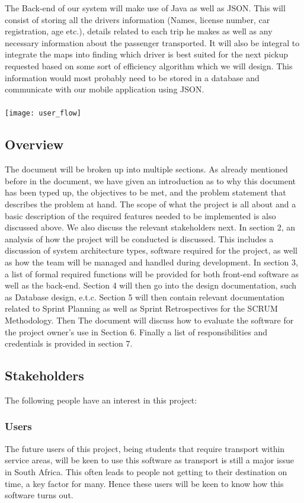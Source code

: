 \documentclass[a4paper,12pt]{article}
\begin{document}
The Back-end of our system will make use of Java as well as JSON. This will consist of storing all the drivers information (Names, license number, car registration, age etc.), details related to each trip he makes as well as any necessary information about the passenger transported. It will also be integral to integrate the maps into finding which driver is best suited for the next pickup requested based on some sort of efficiency algorithm which we will design. This information would most probably need to be stored in a database and communicate with our mobile application using JSON. \\\\
\texttt{[image: user\_flow]}
\pagebreak
\subsection{Overview}
The document will be broken up into multiple sections. As already mentioned before in the document, we have given an introduction as to why this document has been typed up, the objectives to be met, and the problem statement that describes the problem at hand. The scope of what the project is all about and a basic description of the required features needed to be implemented is also discussed above. We also discuss the relevant stakeholders next. In section 2, an analysis of how the project will be conducted is discussed. This includes a discussion of system architecture types, software required for the project, as well as how the team will be managed and handled during development. In section 3, a list of formal required functions will be provided for both front-end software as well as the back-end. Section 4 will then go into the design documentation, such as Database design, e.t.c. Section 5 will then contain relevant documentation related to Sprint Planning as well as Sprint Retrospectives for the SCRUM Methodology. Then The document will discuss how to evaluate the software for the project owner's use in Section 6. Finally a list of responsibilities and credentials is provided in section 7.
\newpage
\subsection{Stakeholders}
The following people have an interest in this project:
\subsubsection{Users}
The future users of this project, being students that require transport within service areas, will be keen to use this software as transport is still a major issue in South Africa. This often leads to people not getting to their destination on time, a key factor for many. Hence these users will be keen to know how this software turns out.
\end{document}
